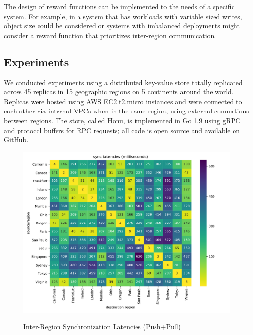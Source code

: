 The design of reward functions can be implemented to the needs of a specific
system.
For example, in a system that has workloads with variable sized writes, object
size could be considered or systems with imbalanced deployments might
consider a reward function that prioritizes inter-region communication.

\subsection{Experiments}

We conducted experiments using a distributed key-value store totally
replicated across 45 replicas in 15 geographic regions on 5 continents
around the world.
Replicas were hosted using AWS EC2 t2.micro instances and were connected to
each other via internal VPCs when in the same region, using external
connections between regions.
The store, called Honu, is implemented in Go 1.9 using gRPC and protocol
buffers for RPC requests; all code is open source and available on GitHub.

\begin{figure}
    \begin{center}
        \includegraphics[width=5in]{figures/ch06_latency_sync_heatmap.pdf}
    \end{center}
    \renewcommand{\baselinestretch}{1}
    \small\normalsize

    \begin{quote}
        \caption[Anti-Entropy Synchronization Latencies]{Inter-Region Synchronization Latencies (Push+Pull)}
        \label{fig:ch06_latency_sync_heatmap}
    \end{quote}
\end{figure}
\renewcommand{\baselinestretch}{2}
\small\normalsize

